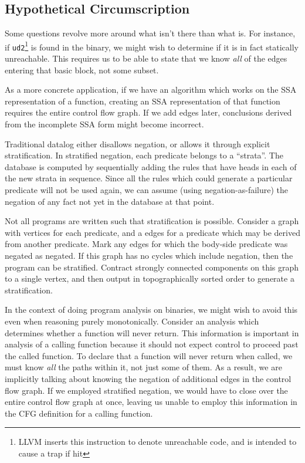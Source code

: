 \subsection{Hypothetical Circumscription}
Some questions revolve more around what isn't there than what is.
For instance, if \texttt{ud2}\footnote{
LLVM inserts this instruction to denote unreachable code, and is intended to cause a trap if hit
} is found in the binary, we might wish to determine if it is in fact statically unreachable.
This requires us to be able to state that we know \emph{all} of the edges entering that basic block, not some subset.

As a more concrete application, if we have an algorithm which works on the SSA representation of a function, creating an SSA representation of that function requires the entire control flow graph.
If we add edges later, conclusions derived from the incomplete SSA form might become incorrect.

Traditional datalog either disallows negation, or allows it through explicit stratification.
In stratified negation, each predicate belongs to a ``strata''.
The database is computed by sequentially adding the rules that have heads in each of the new strata in sequence.
Since all the rules which could generate a particular predicate will not be used again, we can assume (using negation-as-failure) the negation of any fact not yet in the database at that point.

Not all programs are written such that stratification is possible.
Consider a graph with vertices for each predicate, and a edges for a predicate which may be derived from another predicate.
Mark any edges for which the body-side predicate was negated as negated.
If this graph has no cycles which include negation, then the program can be stratified.
Contract strongly connected components on this graph to a single vertex, and then output in topographically sorted order to generate a stratification.

In the context of doing program analysis on binaries, we might wish to avoid this even when reasoning purely monotonically.
Consider an analysis which determines whether a function will never return.
This information is important in analysis of a calling function because it should not expect control to proceed past the called function.
To declare that a function will never return when called, we must know \emph{all} the paths within it, not just some of them.
As a result, we are implicitly talking about knowing the negation of additional edges in the control flow graph.
If we employed stratified negation, we would have to close over the entire control flow graph at once, leaving us unable to employ this information in the CFG definition for a calling function.


